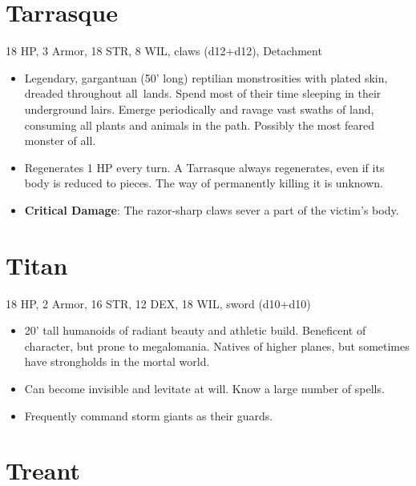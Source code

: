 \documentclass[
  10pt,
  american,
]{article}
\begin{document}
\hypertarget{tarrasque}{%
\section{Tarrasque}\label{tarrasque}}

18 HP, 3 Armor, 18 STR, 8 WIL, claws (d12+d12), Detachment

\begin{samepage}
\begin{itemize}
\setlength\itemsep{-.5em}
\item Legendary, gargantuan (50’ long) reptilian monstrosities with plated skin, dreaded throughout all lands. Spend most of their time sleeping in their underground lairs. Emerge periodically and ravage vast swaths of land, consuming all plants and animals in the path. Possibly the most feared monster of all.
\item Regenerates 1 HP every turn. A Tarrasque always regenerates, even if its body is reduced to pieces. The way of permanently killing it is unknown.
\item \textbf{Critical Damage}: The razor-sharp claws sever a part of the victim's body.
\end{itemize}
\end{samepage}

\hypertarget{titan}{%
\section{Titan}\label{titan}}

18 HP, 2 Armor, 16 STR, 12 DEX, 18 WIL, sword (d10+d10)

\begin{samepage}
\begin{itemize}
\setlength\itemsep{-.5em}
\item 20’ tall humanoids of radiant beauty and athletic build. Beneficent of character, but prone to megalomania. Natives of higher planes, but sometimes have strongholds in the mortal world.
\item Can become invisible and levitate at will. Know a large number of spells.
\item Frequently command storm giants as their guards.
\end{itemize}
\end{samepage}

\hypertarget{treant}{%
\section{Treant}\label{treant}}
\end{document}

